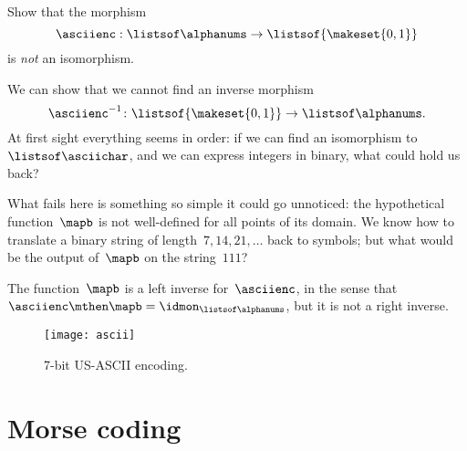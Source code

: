\begin{exercise}
    Show that the morphism
    \begin{equation}
        \label{eq:ascii-to-bin}
        \asciienc: \listsof\alphanums \to \listsof{\makeset{0,1}}
    \end{equation}
    is \emph{not} an isomorphism.
\end{exercise}
\begin{solution}
    We can show that we cannot find an inverse morphism
    \begin{equation}
        \label{eq:bin-to-ascii}
        \asciienc^{-1}\colon  \listsof{\makeset{0,1}} \to \listsof\alphanums.
    \end{equation}
    At first sight everything seems in order: if we can find an isomorphism to~$\listsof\asciichar$, and we can express integers in binary, what could hold us back?

    What fails here is something so simple it could go unnoticed: the hypothetical function~$\mapb$ is not well-defined for all points of its domain.
    We know how to translate a binary string of length~$7,14,21,\ldots$ back to symbols; but what would be the output of~$\mapb$ on the string~$111$?

    The function~$\mapb$ is a left inverse for~$\asciienc$, in the sense that~$\asciienc\mthen \mapb = \idmon_{\listsof\alphanums}$, but it is not a right inverse.

\end{solution}

\vfill
\begin{figure}[h]
    \texttt{[image: ascii]}
    \caption{7-bit US-ASCII encoding. \label{fig:asciifigure}}
\end{figure}

\section{Morse coding}

